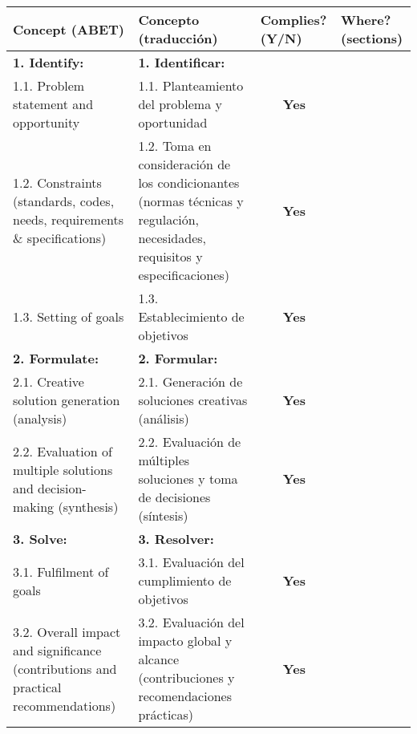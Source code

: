 \vspace*{4mm}

\begingroup
\sf
\footnotesize
\renewcommand{\arraystretch}{1.5}
\begin{tabular}{|m{4.9cm}|m{4.9cm}|m{1.7cm}|m{1.7cm}|}
\hline
\textbf{Concept (ABET)} & \textbf{Concepto (traducción)} & \textbf{Complies? (Y/N)} & \textbf{Where? (sections)} \\ \hline\hline

\textbf{1. Identify:} & \textbf{1. Identificar:} & & \\ \hline
1.1. Problem statement and opportunity & 1.1. Planteamiento del problema y oportunidad 
& \multicolumn{1}{c|}{{\color[HTML]{036400} \textbf{Yes}}}
& 
\\ \hline
1.2. Constraints (standards, codes, needs, requirements \& specifications) & 1.2. Toma en consideración de los condicionantes (normas técnicas y regulación, necesidades, requisitos y especificaciones) 
& \multicolumn{1}{c|}{{\color[HTML]{036400} \textbf{Yes}}}
& 
\\ \hline
1.3. Setting of goals & 1.3. Establecimiento de objetivos 
& \multicolumn{1}{c|}{{\color[HTML]{036400} \textbf{Yes}}}
& 
\\ \hline\hline

\textbf{2. Formulate:} & \textbf{2. Formular:} & & \\ \hline
2.1. Creative solution generation (analysis) & 2.1. Generación de soluciones creativas (análisis) 
& \multicolumn{1}{c|}{{\color[HTML]{036400} \textbf{Yes}}}
& 
\\ \hline
2.2. Evaluation of multiple solutions and decision-making (synthesis) & 2.2. Evaluación de múltiples soluciones y toma de decisiones (síntesis) 
& \multicolumn{1}{c|}{{\color[HTML]{036400} \textbf{Yes}}}
& 
\\ \hline\hline

\textbf{3. Solve:} & \textbf{3. Resolver:} & & \\ \hline
3.1. Fulfilment of goals & 3.1. Evaluación del cumplimiento de objetivos 
& \multicolumn{1}{c|}{{\color[HTML]{036400} \textbf{Yes}}}
& 
\\ \hline
3.2. Overall impact and significance (contributions and practical recommendations) & 3.2. Evaluación del impacto global y alcance (contribuciones y recomendaciones prácticas) 
& \multicolumn{1}{c|}{{\color[HTML]{036400} \textbf{Yes}}}
& 
\\ \hline

\end{tabular}
\endgroup


\endgroup


